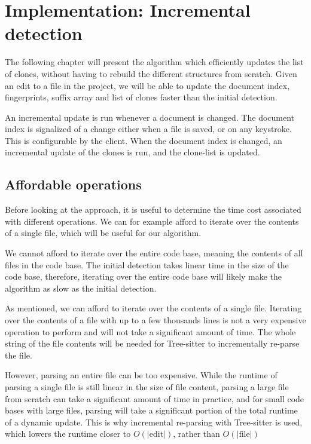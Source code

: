 \chapter{Implementation: Incremental detection}
\label{dynamicdetection}

The following chapter will present the algorithm which efficiently updates the list of
clones, without having to rebuild the different structures from scratch. Given an edit
to a file in the project, we will be able to update the document index, fingerprints,
suffix array and list of clones faster than the initial detection.

An incremental update is run whenever a document is changed. The document index is
signalized of a change either when a file is saved, or on any keystroke. This is
configurable by the client. When the document index is changed, an incremental update of
the clones is run, and the clone-list is updated.

\section{Affordable operations}

Before looking at the approach, it is useful to determine the time cost associated with
different operations. We can for example afford to iterate over the contents of a
single file, which will be useful for our algorithm. 

We cannot afford to iterate over the entire code base, meaning the contents of all files
in the code base. The initial detection takes linear time in the size of the code base,
therefore, iterating over the entire code base will likely make the algorithm as slow as
the initial detection.

As mentioned, we can afford to iterate over the contents of a single file. Iterating over
the contents of a file with up to a few thousands lines is not a very expensive operation
to perform and will not take a significant amount of time. The whole string of the file
contents will be needed for Tree-sitter to incrementally re-parse the file.

However, parsing an entire file can be too expensive. While the runtime of parsing a
single file is still linear in the size of file content, parsing a large file from scratch
can take a significant amount of time in practice, and for small code bases with large
files, parsing will take a significant portion of the total runtime of a dynamic update.
This is why incremental re-parsing with Tree-sitter is used, which lowers the runtime
closer to $O(\vert\text{edit}\vert)$, rather than $O(\vert \text{file} \vert)$

